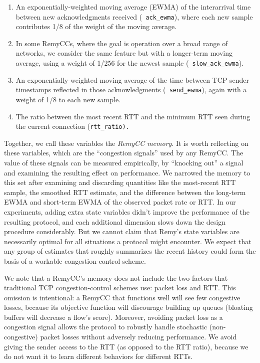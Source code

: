 \begin{enumerate}

\item An exponentially-weighted moving average (EWMA) of the
  interarrival time between new acknowledgments received ({\tt
    ack\_ewma}), where each new sample contributes 1/8 of the weight
  of the moving average.

\item In some RemyCCs, where the goal is operation over a broad range
  of networks, we consider the same feature but with a longer-term
  moving average, using a weight of 1/256 for the newest sample ({\tt
    slow\_ack\_ewma}).

\item An exponentially-weighted moving average of the time between TCP
  sender timestamps reflected in those acknowledgments ({\tt
    send\_ewma}), again with a weight of 1/8 to each new sample.

\item The ratio between the most recent RTT and the minimum RTT seen
  during the current connection (\tt{rtt\_ratio}).

\end{enumerate}

Together, we call these variables the {\em RemyCC memory}. It is worth
reflecting on these variables, which are the ``congestion signals''
used by any RemyCC. The value of these signals can be measured
empirically, by ``knocking out'' a signal and examining the resulting
effect on performance. We narrowed the memory to this set after
examining and discarding quantities like the most-recent RTT sample,
the smoothed RTT estimate, and the difference between the long-term
EWMA and short-term EWMA of the observed packet rate or RTT. In our
experiments, adding extra state variables didn't improve the
performance of the resulting protocol, and each additional dimension
slows down the design procedure considerably. But we cannot claim that
Remy's state variables are necessarily optimal for all situations a
protocol might encounter. We expect that any group of estimates that
roughly summarizes the recent history could form the basis of a
workable congestion-control scheme.

We note that a RemyCC's memory does not include the two
factors that traditional TCP congestion-control schemes use: packet
loss and RTT. This omission is intentional: a RemyCC that functions
well will see few congestive losses, because its objective function
will discourage building up queues (bloating buffers will decrease a
flow's score).  Moreover, avoiding packet loss as a congestion signal
allows the protocol to robustly handle stochastic (non-congestive)
packet losses without adversely reducing performance. We
avoid giving the sender access to the RTT (as opposed to the RTT
ratio), because we do not want it to learn different behaviors for
different RTTs.

